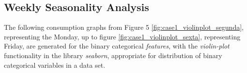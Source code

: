                 \begin{figure}[H]
                \end{figure}
             
            
    	    \subsection{Weekly Seasonality Analysis}
    	        The following consumption graphs from Figure 5 \ref{fig:case1_violinplot_segunda}, representing the Monday, up to figure \ref{fig:case1_violinplot_sexta}, representing Friday, are generated for the binary categorical \textit{features}, with the \textit{violin-plot} functionality in the library \textit{seaborn}, appropriate for distribution of binary categorical variables in a data set.
    	        
